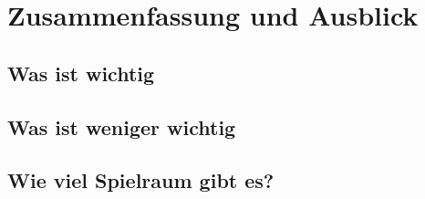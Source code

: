 \section{Zusammenfassung und Ausblick}

\subsection{Was ist wichtig}

\subsection{Was ist weniger wichtig}

\subsection{Wie viel Spielraum gibt es?}